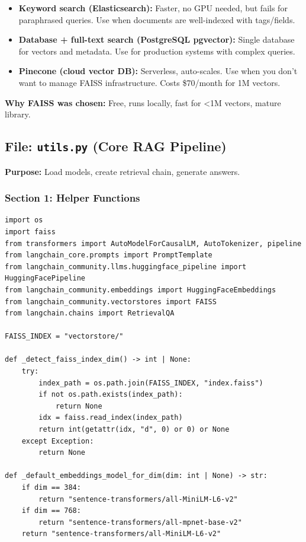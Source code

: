 \documentclass[11pt,a4paper]{article}
\begin{document}
\begin{itemize}
\item \textbf{Keyword search (Elasticsearch):} Faster, no GPU needed, but fails for paraphrased queries. Use when documents are well-indexed with tags/fields.
\item \textbf{Database + full-text search (PostgreSQL pgvector):} Single database for vectors and metadata. Use for production systems with complex queries.
\item \textbf{Pinecone (cloud vector DB):} Serverless, auto-scales. Use when you don't want to manage FAISS infrastructure. Costs \$70/month for 1M vectors.
\end{itemize}

\textbf{Why FAISS was chosen:} Free, runs locally, fast for <1M vectors, mature library.

\subsection{File: \texttt{utils.py} (Core RAG Pipeline)}

\textbf{Purpose:} Load models, create retrieval chain, generate answers.

\subsubsection{Section 1: Helper Functions}

\begin{lstlisting}
import os
import faiss
from transformers import AutoModelForCausalLM, AutoTokenizer, pipeline
from langchain_core.prompts import PromptTemplate
from langchain_community.llms.huggingface_pipeline import HuggingFacePipeline
from langchain_community.embeddings import HuggingFaceEmbeddings
from langchain_community.vectorstores import FAISS
from langchain.chains import RetrievalQA

FAISS_INDEX = "vectorstore/"

def _detect_faiss_index_dim() -> int | None:
    try:
        index_path = os.path.join(FAISS_INDEX, "index.faiss")
        if not os.path.exists(index_path):
            return None
        idx = faiss.read_index(index_path)
        return int(getattr(idx, "d", 0) or 0) or None
    except Exception:
        return None

def _default_embeddings_model_for_dim(dim: int | None) -> str:
    if dim == 384:
        return "sentence-transformers/all-MiniLM-L6-v2"
    if dim == 768:
        return "sentence-transformers/all-mpnet-base-v2"
    return "sentence-transformers/all-MiniLM-L6-v2"
\end{lstlisting}
\end{document}
